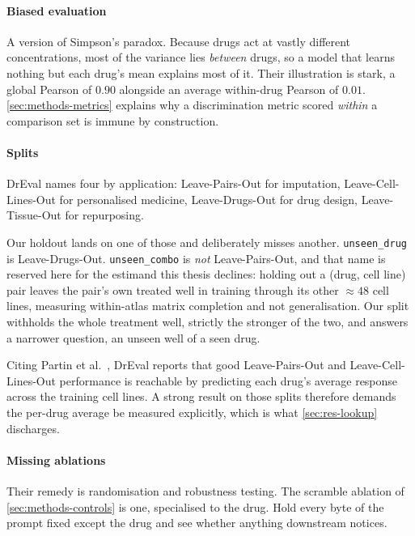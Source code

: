\paragraph{Biased evaluation} A version of Simpson's paradox. Because drugs act
at vastly different concentrations, most of the variance lies \emph{between}
drugs, so a model that learns nothing but each drug's mean explains most of it.
Their illustration is stark, a global Pearson of $0.90$ alongside an average
within-drug Pearson of $0.01$. \cref{sec:methods-metrics} explains why a
discrimination metric scored \emph{within} a comparison set is immune by
construction.

\paragraph{Splits} DrEval names four by application: Leave-Pairs-Out for
imputation, Leave-Cell-Lines-Out for personalised medicine, Leave-Drugs-Out for
drug design, Leave-Tissue-Out for
repurposing.

Our holdout lands on one of those and deliberately misses another.
\texttt{unseen\_drug} is Leave-Drugs-Out. \texttt{unseen\_combo} is \emph{not}
Leave-Pairs-Out, and that name is reserved here for the estimand this thesis
declines: holding out a (drug, cell line) pair leaves the pair's own treated well
in training through its other $\approx 48$ cell lines, measuring within-atlas
matrix completion and not generalisation. Our split withholds the whole treatment
well, strictly the stronger of the two, and answers a narrower question, an
unseen well of a seen drug.

Citing Partin et al.~\cite{partin}, DrEval reports that good Leave-Pairs-Out and
Leave-Cell-Lines-Out performance is reachable by predicting each drug's
average response across the training cell lines. A strong result on those splits
therefore demands the per-drug average be measured explicitly, which is what
\cref{sec:res-lookup} discharges.

\paragraph{Missing ablations} Their remedy is randomisation and robustness
testing. The scramble ablation of \cref{sec:methods-controls} is one, specialised
to the drug. Hold every byte of the prompt fixed except the drug and see whether
anything downstream notices.

